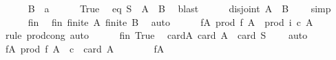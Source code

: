 \begin{isabellebody}
\ \ \ \ \isamarkupfalse%
\ {\isacharquery}{\kern0pt}B\ {\isacharequal}{\kern0pt}\ {\isachardoublequoteopen}{\isacharbraceleft}{\kern0pt}a{\isacharbraceright}{\kern0pt}{\isachardoublequoteclose}\isanewline
\ \ \ \ \isamarkupfalse%
\ True\ \isamarkupfalse%
\ eq{\isacharcolon}{\kern0pt}\ {\isachardoublequoteopen}S\ {\isacharequal}{\kern0pt}\ {\isacharquery}{\kern0pt}A\ {\isasymunion}\ {\isacharquery}{\kern0pt}B{\isachardoublequoteclose}\ \isamarkupfalse%
\ blast\isanewline
\ \ \ \ \isamarkupfalse%
\ disjoint{\isacharcolon}{\kern0pt}\ {\isachardoublequoteopen}{\isacharquery}{\kern0pt}A\ {\isasyminter}\ {\isacharquery}{\kern0pt}B\ {\isacharequal}{\kern0pt}\ {\isacharbraceleft}{\kern0pt}{\isacharbraceright}{\kern0pt}{\isachardoublequoteclose}\ \isamarkupfalse%
\ simp\isanewline
\ \ \ \ \isamarkupfalse%
\ fin\ \isamarkupfalse%
\ fin{\isacharprime}{\kern0pt}{\isacharcolon}{\kern0pt}\ {\isachardoublequoteopen}finite\ {\isacharquery}{\kern0pt}A{\isachardoublequoteclose}\ {\isachardoublequoteopen}finite\ {\isacharquery}{\kern0pt}B{\isachardoublequoteclose}\ \isamarkupfalse%
\ auto\isanewline
\ \ \ \ \isamarkupfalse%
\ f{\isacharunderscore}{\kern0pt}A{}{\isacharcolon}{\kern0pt}\ {\isachardoublequoteopen}prod\ {\isacharquery}{\kern0pt}f\ {\isacharquery}{\kern0pt}A\ {\isacharequal}{\kern0pt}\ prod\ {\isacharparenleft}{\kern0pt}{\isasymlambda}i{\isachardot}{\kern0pt}\ c{\isacharparenright}{\kern0pt}\ {\isacharquery}{\kern0pt}A{\isachardoublequoteclose}\isanewline
\ \ \ \ \ \ \isamarkupfalse%
\ {\isacharparenleft}{\kern0pt}rule\ prod{\isachardot}{\kern0pt}cong{\isacharparenright}{\kern0pt}\ auto\isanewline
\ \ \ \ \isamarkupfalse%
\ fin\ True\ \isamarkupfalse%
\ card{\isacharunderscore}{\kern0pt}A{\isacharcolon}{\kern0pt}\ {\isachardoublequoteopen}card\ {\isacharquery}{\kern0pt}A\ {\isacharequal}{\kern0pt}\ card\ S\ {\isacharminus}{\kern0pt}\ {}{\isachardoublequoteclose}\ \isamarkupfalse%
\ auto\isanewline
\ \ \ \ \isamarkupfalse%
\ f{\isacharunderscore}{\kern0pt}A{}{\isacharcolon}{\kern0pt}\ {\isachardoublequoteopen}prod\ {\isacharquery}{\kern0pt}f\ {\isacharquery}{\kern0pt}A\ {\isacharequal}{\kern0pt}\ c\ {\isacharcircum}{\kern0pt}\ card\ {\isacharquery}{\kern0pt}A{\isachardoublequoteclose}\isanewline
\ \ \ \ \ \ \isamarkupfalse%
\ f{\isacharunderscore}{\kern0pt}A{}\ \isamarkupfalse%

\end{isabellebody}
